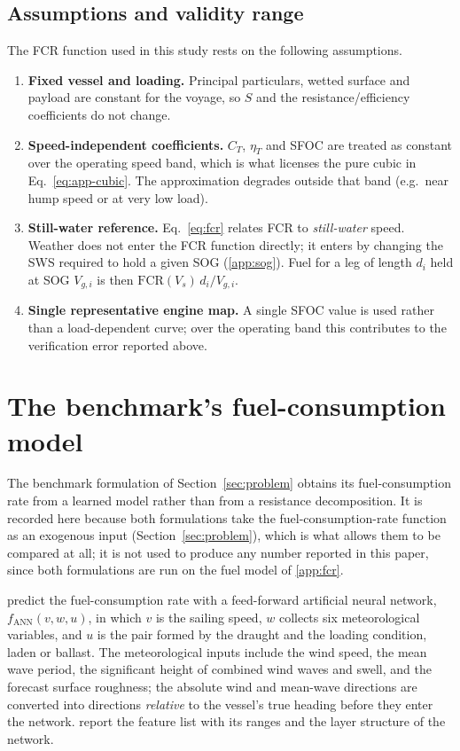 \documentclass[review,authoryear]{elsarticle}
\newcommand{\fcr}{\mathrm{FCR}}
\begin{document}
\subsection{Assumptions and validity range}
\label{app:fcr-assumptions}
The FCR function used in this study rests on the following assumptions.
\begin{enumerate}
\item \textbf{Fixed vessel and loading.} Principal particulars, wetted surface and payload are
constant for the voyage, so $S$ and the resistance/efficiency coefficients do not change.
\item \textbf{Speed-independent coefficients.} $C_T$, $\eta_T$ and SFOC are treated as constant over
the operating speed band, which is what licenses the pure cubic in Eq.~\eqref{eq:app-cubic}. The
approximation degrades outside that band (e.g.\ near hump speed or at very low load).
\item \textbf{Still-water reference.} Eq.~\eqref{eq:fcr} relates FCR to \emph{still-water} speed.
Weather does not enter the FCR function directly; it enters by changing the SWS required to hold a
given SOG (\ref{app:sog}). Fuel for a leg of length $d_i$ held at SOG $V_{g,i}$ is then
$\fcr(V_s)\,d_i/V_{g,i}$.
\item \textbf{Single representative engine map.} A single SFOC value is used rather than a
load-dependent curve; over the operating band this contributes to the verification error reported
above.
\end{enumerate}

\section{The benchmark's fuel-consumption model}
\label{app:fcr-luo}

The benchmark formulation of Section~\ref{sec:problem} obtains its fuel-consumption rate from a
learned model rather than from a resistance decomposition. It is recorded here because both
formulations take the fuel-consumption-rate function as an exogenous input
(Section~\ref{sec:problem}), which is what allows them to be compared at all; it is not used to
produce any number reported in this paper, since both formulations are run on the fuel model of
\ref{app:fcr}.

\citet{luo2024} predict the fuel-consumption rate with a feed-forward artificial neural network,
$f_{\mathrm{ANN}}(v,w,u)$, in which $v$ is the sailing speed, $w$ collects six meteorological
variables, and $u$ is the pair formed by the draught and the loading condition, laden or ballast. The
meteorological inputs include the wind speed, the mean wave period, the significant height of combined
wind waves and swell, and the forecast surface roughness; the absolute wind and mean-wave directions
are converted into directions \emph{relative} to the vessel's true heading before they enter the
network. \citet{luo2024} report the feature list with its ranges and the layer structure of the
network.
\end{document}
